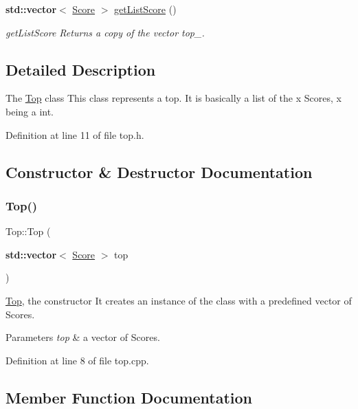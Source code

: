 \begin{DoxyCompactItemize}
\textbf{ std\+::vector}$<$ \hyperlink{class_score}{Score} $>$ \hyperlink{class_top_aef6a8f55e1db5c9c39e0978627af63d1}{get\+List\+Score} ()
\begin{DoxyCompactList}\small\item\em get\+List\+Score Returns a copy of the vector top\+\_\+. \end{DoxyCompactList}\end{DoxyCompactItemize}


\subsection{Detailed Description}
The \hyperlink{class_top}{Top} class This class represents a top. It is basically a list of the x Scores, x being a int. 

Definition at line 11 of file top.\+h.



\subsection{Constructor \& Destructor Documentation}
\mbox{\label{class_top_a34354b5614915b4001460886cb0f9350}} 
\subsubsection{\texorpdfstring{Top()}{Top()}}
{\footnotesize\ttfamily Top\+::\+Top (\begin{DoxyParamCaption}\item[{\textbf{ std\+::vector}$<$ \hyperlink{class_score}{Score} $>$}]{top }\end{DoxyParamCaption})}



\hyperlink{class_top}{Top}, the constructor It creates an instance of the class with a predefined vector of Scores. 


\begin{DoxyParams}{Parameters}
{\em top} & a vector of Scores. \\
\hline
\end{DoxyParams}


Definition at line 8 of file top.\+cpp.



\subsection{Member Function Documentation}
\mbox{\label{class_top_a66039146b2d0a09171048facdb9a32d0}} 
